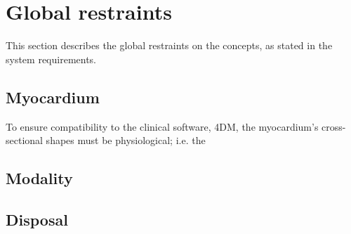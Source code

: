 \section{Global restraints}
This section describes the global restraints on the concepts, as stated in the system requirements.
\subsection{Myocardium}
To ensure compatibility to the clinical software, 4DM, the myocardium's cross-sectional shapes must be physiological; i.e. the 
\subsection{Modality}
\subsection{Disposal}
